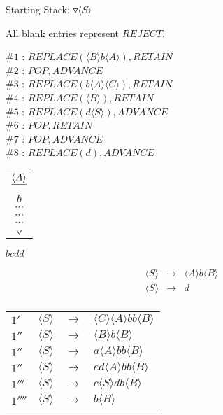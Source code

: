 \documentclass[a4paper,12pt]{article}
\newcommand{\nonterminal}[1]{\langle #1 \rangle}
\begin{document}
Starting Stack: $\triangledown \nonterminal{S}$

All blank entries represent $REJECT$.

$\#1$ : $REPLACE(\nonterminal{B} b \nonterminal{A}),RETAIN$	\\
$\#2$ : $POP,ADVANCE$													\\
$\#3$ : $REPLACE(b \nonterminal{A} \nonterminal{C}),RETAIN$	\\
$\#4$ : $REPLACE(\nonterminal{B}), RETAIN$						\\
$\#5$ : $REPLACE(d \nonterminal{S}),ADVANCE$						\\
$\#6$ : $POP,RETAIN$														\\
$\#7$ : $POP,ADVANCE$													\\
$\#8$ : $REPLACE(d),ADVANCE$											\\

\begin{tabular}{|c|}
\hspace{15mm}						\\
\hline
$\sout{\nonterminal{A}}$		\\
\hline
$b$									\\
\hline
$\cdots$								\\
$\cdots$								\\
$\cdots$								\\
\hline
$\triangledown$					\\
\hline
\end{tabular}

$bcdd$

\begin{table}[hbtp]


\end{table}

\begin{eqnarray*}
\nonterminal{S}	&	\to	&	\nonterminal{A} b \nonterminal{B}		\\
\nonterminal{S}	&	\to	&	d													\\
\end{eqnarray*}

\begin{tabular}{llll}
$1'$		&	$\nonterminal{S}$	&	$\to$	&	$\nonterminal{C}\nonterminal{A} b b \nonterminal{B}$		\\
$1''$		&	$\nonterminal{S}$	&	$\to$	&	$\nonterminal{B} b \nonterminal{B}$ 							\\
$1''$		&	$\nonterminal{S}$	&	$\to$	&	$a \nonterminal{A} b b \nonterminal{B}$ 						\\
$1''$		&	$\nonterminal{S}$	&	$\to$	&	$e d \nonterminal{A} b b \nonterminal{B}$						\\
$1'''$	&	$\nonterminal{S}$	&	$\to$	&	$c \nonterminal{S} d b \nonterminal{B}$						\\
$1''''$	&	$\nonterminal{S}$	&	$\to$	&	$b \nonterminal{B}$													\\
\end{tabular}
\end{document}
